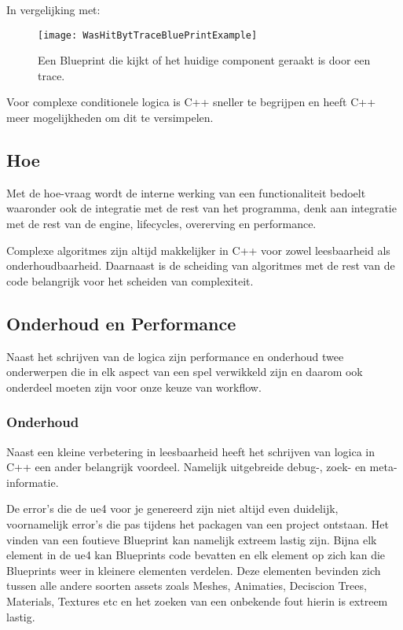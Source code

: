 In vergelijking met:

\begin{figure}[!ht]
  \centering
    \texttt{[image: WasHitBytTraceBluePrintExample]}
    \caption{Een Blueprint die kijkt of het huidige component geraakt is door een trace.}
\end{figure}

Voor complexe conditionele logica is C++ sneller te begrijpen en heeft C++ meer mogelijkheden om dit te versimpelen. 

\subsection{Hoe}
Met de hoe-vraag wordt de interne werking van een functionaliteit bedoelt waaronder ook de integratie met de rest van het programma, denk aan integratie met de rest van de engine, lifecycles, overerving en performance.

Complexe algoritmes zijn altijd makkelijker in C++ voor zowel leesbaarheid als onderhoudbaarheid. Daarnaast is de scheiding van algoritmes met de rest van de code belangrijk voor het scheiden van complexiteit.

\subsection{Onderhoud en Performance}
Naast het schrijven van de logica zijn performance en onderhoud twee onderwerpen die in elk aspect van een spel verwikkeld zijn en daarom ook onderdeel moeten zijn voor onze keuze van workflow.

\subsubsection{Onderhoud}
Naast een kleine verbetering in leesbaarheid heeft het schrijven van logica in C++ een ander belangrijk voordeel. Namelijk uitgebreide debug-, zoek- en meta-informatie. 

De error’s die de \gls{ue4} voor je genereerd zijn niet altijd even duidelijk, voornamelijk error’s die pas tijdens het packagen van een project ontstaan. Het vinden van een foutieve Blueprint kan namelijk extreem lastig zijn. Bijna elk element in de \gls{ue4} kan Blueprints code bevatten en elk element op zich kan die Blueprints weer in kleinere elementen verdelen. Deze elementen bevinden zich tussen alle andere soorten assets zoals Meshes, Animaties, Deciscion Trees, Materials, Textures etc en het zoeken van een onbekende fout hierin is extreem lastig.

